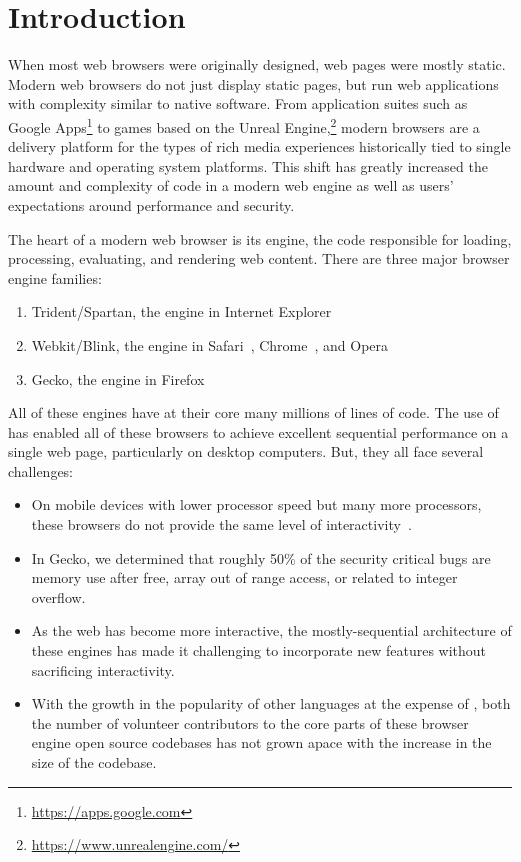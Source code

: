 \section{Introduction}
\label{sec:intro}
When most web browsers were originally designed, web pages were mostly static.
Modern web browsers do not just display static pages, but run web applications
with complexity similar to native software.
From application suites such as Google Apps\footnote{\url{https://apps.google.com}} to games
based on the Unreal Engine,\footnote{\url{https://www.unrealengine.com/}}
modern browsers are a delivery platform for the types of rich media experiences historically
tied to single hardware and operating system platforms.
This shift has greatly increased the amount and complexity of code in a modern web engine
as well as users' expectations around performance and security.

The heart of a modern web browser is its engine, the code responsible
for loading, processing, evaluating, and rendering web content.
There are three major browser engine families:
\begin{enumerate}
\item Trident/Spartan, the engine in Internet Explorer~\cite{IE}
\item Webkit\cite{WEBKIT}/Blink, the engine in Safari~\cite{SAFARI}, Chrome~\cite{CHROME}, and Opera~\cite{OPERA}
\item Gecko, the engine in Firefox~\cite{FIREFOX}
\end{enumerate}
All of these engines have at their core many millions of lines of \Cplusplus{} code.
The use of \Cplusplus{} has enabled all of these browsers to achieve excellent sequential
performance on a single web page, particularly on desktop computers.
But, they all face several challenges:
\begin{itemize}
  \item On mobile devices with lower processor speed but many more processors, these browsers
    do not provide the same level of interactivity~\cite{parallelizing-web-pages,ZOOMM}.
  \item In Gecko, we determined that roughly 50\% of the security critical bugs are memory use after
    free, array out of range access, or related to integer overflow.
  \item As the web has become more interactive, the mostly-sequential architecture of these engines
    has made it challenging to incorporate new features without sacrificing interactivity.
  \item With the growth in the popularity of other languages at the expense of \Cplusplus{}, both
    the number of volunteer contributors to the core \Cplusplus{} parts of these browser engine
    open source codebases has not grown apace with the increase in the size
    of the codebase.
\end{itemize}

